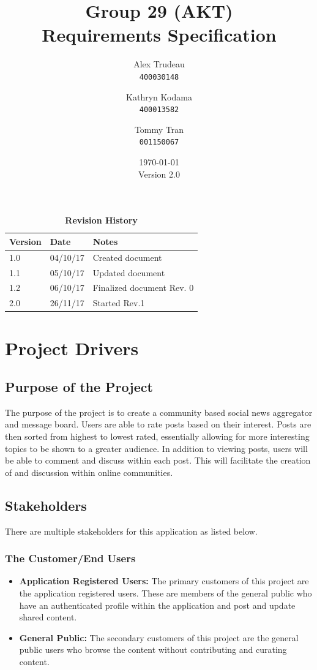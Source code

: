 \documentclass[12pt,fleqn]{article}
\title{Group 29 (AKT)\\ Requirements Specification}
\author{
Alex Trudeau\\
	\texttt{400030148}
\and
Kathryn Kodama\\
  	\texttt{400013582}
\and
Tommy Tran\\
	\texttt{001150067}
}
\date{\today\\Version 2.0}
\begin{document}
\maketitle

\pagebreak
\tableofcontents
\listoftables
\listoffigures

\begin{table}[ht]
\caption{\bf Revision History}
\begin{tabularx}{\textwidth}{p{3cm}p{2cm}X}
\toprule {\bf Version} & {\bf Date} & {\bf Notes}\\
\midrule
1.0 & 04/10/17 & Created document \\
1.1 & 05/10/17 & Updated document \\
1.2 & 06/10/17 & Finalized document Rev. 0 \\
2.0 & 26/11/17 & Started Rev.1 \\
\bottomrule
\end{tabularx}
\end{table}

\clearpage
 


\section {Project Drivers}

\subsection {Purpose of the Project}
The purpose of the project is to create a community based social news aggregator and message board. Users are able to rate posts based on their interest. Posts are then sorted from highest to lowest rated, essentially allowing for more interesting topics to be shown to a greater audience. In addition to viewing posts, users will be able to comment and discuss within each post.  This will facilitate the creation of and discussion within online communities.

\subsection {Stakeholders}

There are multiple stakeholders for this application as listed below.

\subsubsection* {The Customer/End Users}
\begin{itemize} 
\item \textbf{Application Registered Users: }The primary customers of this project are the application registered users. These are members of the general public who have an authenticated profile within the application and post and update shared content.
\item \textbf{General Public: }The secondary customers of this project are the general public users who browse the content without contributing and curating content.
\end{itemize}
\end{document}
